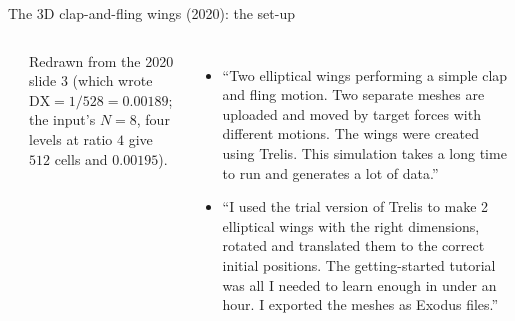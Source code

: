 \documentclass[aspectratio=169,11pt]{beamer}
\begin{document}
\begin{frame}{The 3D clap-and-fling wings (2020): the set-up}
\label{fr:wings}
\footnotesize
\begin{columns}[T]
\begin{center}
\end{center}
\scriptsize Redrawn from the 2020 slide 3 (which wrote $\mathrm{DX} = 1/528 = 0.00189$; the input's $N = 8$, four levels at ratio $4$ give $512$ cells and $0.00195$).
\begin{itemize}
  \item ``Two elliptical wings performing a simple clap and fling motion. Two separate meshes are uploaded and moved by target forces with different motions. The wings were created using Trelis. This simulation takes a long time to run and generates a lot of data.''
  \item ``I used the trial version of Trelis to make 2 elliptical wings with the right dimensions, rotated and translated them to the correct initial positions. The getting-started tutorial was all I needed to learn enough in under an hour. I exported the meshes as Exodus  files.''
\end{itemize}
\end{columns}
\end{frame}
\end{document}
